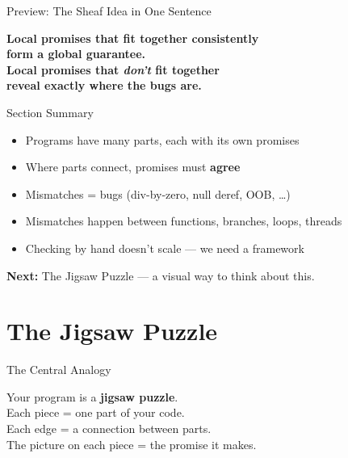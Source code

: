 \documentclass[aspectratio=169,10pt]{beamer}
\begin{document}
\begin{frame}{Preview: The Sheaf Idea in One Sentence}
\begin{center}
\Large\bfseries
Local promises that fit together consistently\\
form a global guarantee.\\[0.5em]
\normalsize
Local promises that \emph{don't} fit together\\
reveal exactly where the bugs are.
\end{center}
\end{frame}

\begin{frame}{Section Summary}
\begin{itemize}
  \item Programs have many parts, each with its own promises
  \item Where parts connect, promises must \textbf{agree}
  \item Mismatches = bugs (div-by-zero, null deref, OOB, \ldots)
  \item Mismatches happen between functions, branches, loops, threads
  \item Checking by hand doesn't scale --- we need a framework
\end{itemize}
\vspace{0.3em}
\begin{center}
\textbf{Next:} The Jigsaw Puzzle --- a visual way to think about this.
\end{center}
\end{frame}

\section{The Jigsaw Puzzle}

\begin{frame}{The Central Analogy}
\begin{center}
\Large
Your program is a \textbf{jigsaw puzzle}.\\[0.5em]
\normalsize
Each piece = one part of your code.\\
Each edge = a connection between parts.\\
The picture on each piece = the promise it makes.
\end{center}
\end{frame}
\end{document}
